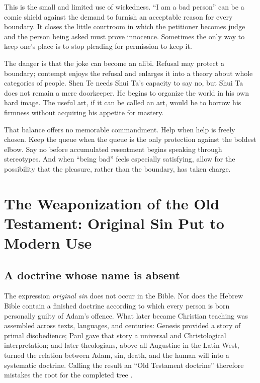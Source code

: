 ﻿\documentclass[12pt,a4paper]{book}
\begin{document}
This is the small and limited use of wickedness.  ``I am a bad person'' can be
a comic shield against the demand to furnish an acceptable reason for every
boundary.  It closes the little courtroom in which the petitioner becomes
judge and the person being asked must prove innocence.  Sometimes the only
way to keep one's place is to stop pleading for permission to keep it.

The danger is that the joke can become an alibi.  Refusal may protect a
boundary; contempt enjoys the refusal and enlarges it into a theory about
whole categories of people.  Shen Te needs Shui Ta's capacity to say no, but
Shui Ta does not remain a mere doorkeeper.  He begins to organize the world in
his own hard image.  The useful art, if it can be called an art, would be to
borrow his firmness without acquiring his appetite for mastery.

That balance offers no memorable commandment.  Help when help is freely chosen.
Keep the queue when the queue is the only protection against the boldest elbow.
Say no before accumulated resentment begins speaking through stereotypes.
And when ``being bad'' feels especially satisfying, allow for the possibility
that the pleasure, rather than the boundary, has taken charge.


\chapter[The Weaponization of the Old Testament]{The Weaponization of the Old Testament: Original Sin Put to Modern Use}
\label{chap:weaponized-original-sin}

\section{A doctrine whose name is absent}

The expression \emph{original sin} does not occur in the Bible.  Nor does the
Hebrew Bible contain a finished doctrine according to which every person is
born personally guilty of Adam's offence.  What later became Christian
teaching was assembled across texts, languages, and centuries: Genesis
provided a story of primal disobedience; Paul gave that story a universal and
Christological interpretation; and later theologians, above all Augustine in
the Latin West, turned the relation between Adam, sin, death, and the human
will into a systematic doctrine.  Calling the result an ``Old Testament
doctrine'' therefore mistakes the root for the completed tree
\cite{NRSVue2021,TimpeChristianSin2021,BeatriceTransmissionSin2013}.
\end{document}

